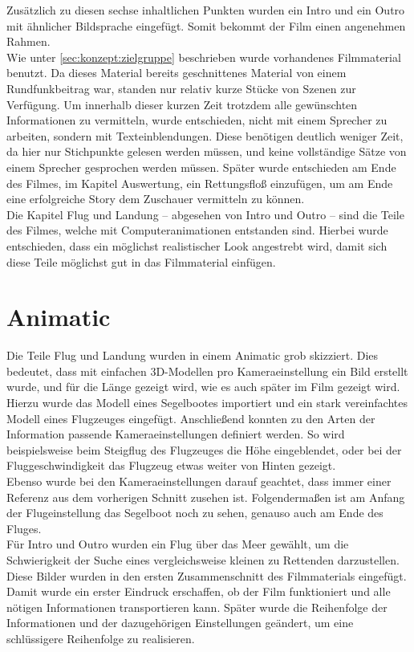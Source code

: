 Zusätzlich zu diesen sechse inhaltlichen Punkten wurden ein Intro und ein Outro mit ähnlicher Bildsprache eingefügt. Somit bekommt der Film einen angenehmen Rahmen.\\
Wie unter \autoref{sec:konzept:zielgruppe} beschrieben wurde vorhandenes Filmmaterial benutzt. Da dieses Material bereits geschnittenes Material von einem Rundfunkbeitrag war, standen nur relativ kurze Stücke von Szenen zur Verfügung. Um innerhalb dieser kurzen Zeit trotzdem alle gewünschten Informationen zu vermitteln, wurde entschieden, nicht mit einem Sprecher zu arbeiten, sondern mit Texteinblendungen. Diese benötigen deutlich weniger Zeit, da hier nur Stichpunkte gelesen werden müssen, und keine vollständige Sätze von einem Sprecher gesprochen werden müssen.
Später wurde entschieden am Ende des Filmes, im Kapitel Auswertung, ein Rettungsfloß einzufügen, um am Ende eine erfolgreiche Story dem Zuschauer vermitteln zu können.\\
Die Kapitel Flug und Landung -- abgesehen von Intro und Outro -- sind die Teile des Filmes, welche mit Computeranimationen entstanden sind. Hierbei wurde entschieden, dass ein möglichst realistischer Look angestrebt wird, damit sich diese Teile möglichst gut in das Filmmaterial einfügen.

\section{Animatic} %
\label{sec:konzept:animatic}

Die Teile Flug und Landung wurden in einem Animatic grob skizziert. Dies bedeutet, dass mit einfachen 3D-Modellen pro Kameraeinstellung ein Bild erstellt wurde, und für die Länge gezeigt wird, wie es auch später im Film gezeigt wird. Hierzu wurde das Modell eines Segelbootes importiert und ein stark vereinfachtes Modell eines Flugzeuges eingefügt. Anschließend konnten zu den Arten der Information passende Kameraeinstellungen definiert werden. So wird beispielsweise beim Steigflug des Flugzeuges die Höhe eingeblendet, oder bei der Fluggeschwindigkeit das Flugzeug etwas weiter von Hinten gezeigt. \\
Ebenso wurde bei den Kameraeinstellungen darauf geachtet, dass immer einer Referenz aus dem vorherigen Schnitt zusehen ist. Folgendermaßen ist am Anfang der Flugeinstellung das Segelboot noch zu sehen, genauso auch am Ende des Fluges.\\
Für Intro und Outro wurden ein Flug über das Meer gewählt, um die Schwierigkeit der Suche eines vergleichsweise kleinen zu Rettenden darzustellen.
Diese Bilder wurden in den ersten Zusammenschnitt des Filmmaterials eingefügt. Damit wurde ein erster Eindruck erschaffen, ob der Film funktioniert und alle nötigen Informationen transportieren kann. Später wurde die Reihenfolge der Informationen und der dazugehörigen Einstellungen geändert, um eine schlüssigere Reihenfolge zu realisieren.


